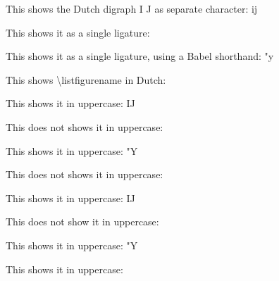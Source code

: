 \documentclass{article}
\begin{document}
This shows the Dutch digraph I J as separate character: ij

This shows it as a single ligature: \ij{}

This shows it as a single ligature, using a Babel shorthand: "y

This shows {\textbackslash}listfigurename in Dutch: \listfigurename

This shows it in uppercase: \uppercase{ij}

This does not shows it in uppercase: \uppercase{\ij{}}

This shows it in uppercase: \uppercase{"y}

This does not shows it in uppercase: \uppercase{\listfigurename}

This shows it in uppercase: \MakeUppercase{ij}

This does not show it in uppercase: \MakeUppercase{\ij{}}

This shows it in uppercase: \MakeUppercase{"y}

This shows it in uppercase: \MakeUppercase{\listfigurename}
\end{document}
